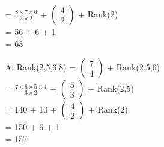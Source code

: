\documentclass[11pt]{article} %
\begin{document}
\begin{enumerate}
\begin{enumerate}
				= $\frac{8\times7\times6}{3\times2}$ + $\left(\begin{array}{c}  4 \\ 2 \end{array}\right)$ + Rank(2)\\
				= 56 + 6 + 1 \\
				= 63
		\item[A:] \nobreak
				Rank(2,5,6,8) = $\left(\begin{array}{c}  7 \\ 4 \end{array}\right)$ + Rank(2,5,6)\\
				= $\frac{7\times6\times5\times4}{3\times2}$ + $\left(\begin{array}{c}  5 \\ 3 \end{array}\right)$ + Rank(2,5)\\
				= 140 + 10 + $\left(\begin{array}{c}  4 \\ 2 \end{array}\right)$ + Rank(2)\\
				= 150 + 6 + 1 \\
				= 157
	\end{enumerate}
\end{enumerate}
\end{document}
